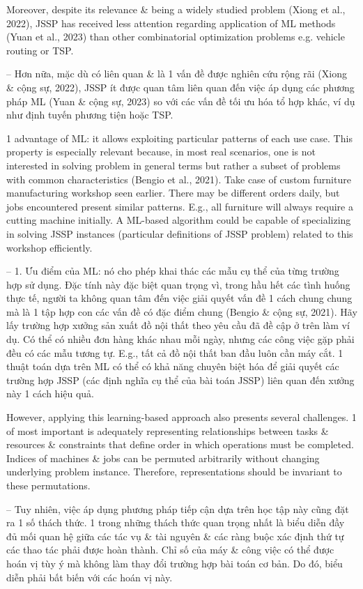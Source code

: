 \documentclass{article}
\begin{document}
\begin{itemize}
    Moreover, despite its relevance \& being a widely studied problem (Xiong et al., 2022), JSSP has received less attention regarding application of ML methods (Yuan et al., 2023) than other combinatorial optimization problems e.g. vehicle routing or TSP.

    -- Hơn nữa, mặc dù có liên quan \& là 1 vấn đề được nghiên cứu rộng rãi (Xiong \& cộng sự, 2022), JSSP ít được quan tâm liên quan đến việc áp dụng các phương pháp ML (Yuan \& cộng sự, 2023) so với các vấn đề tối ưu hóa tổ hợp khác, ví dụ như định tuyến phương tiện hoặc TSP.

    1 advantage of ML: it allows exploiting particular patterns of each use case. This property is especially relevant because, in most real scenarios, one is not interested in solving problem in general terms but rather a subset of problems with common characteristics (Bengio et al., 2021). Take case of custom furniture manufacturing workshop seen earlier. There may be different orders daily, but jobs encountered present similar patterns. E.g., all furniture will always require a cutting machine initially. A ML-based algorithm could be capable of specializing in solving JSSP instances (particular definitions of JSSP problem) related to this workshop efficiently.

    -- 1. Ưu điểm của ML: nó cho phép khai thác các mẫu cụ thể của từng trường hợp sử dụng. Đặc tính này đặc biệt quan trọng vì, trong hầu hết các tình huống thực tế, người ta không quan tâm đến việc giải quyết vấn đề 1 cách chung chung mà là 1 tập hợp con các vấn đề có đặc điểm chung (Bengio \& cộng sự, 2021). Hãy lấy trường hợp xưởng sản xuất đồ nội thất theo yêu cầu đã đề cập ở trên làm ví dụ. Có thể có nhiều đơn hàng khác nhau mỗi ngày, nhưng các công việc gặp phải đều có các mẫu tương tự. E.g., tất cả đồ nội thất ban đầu luôn cần máy cắt. 1 thuật toán dựa trên ML có thể có khả năng chuyên biệt hóa để giải quyết các trường hợp JSSP (các định nghĩa cụ thể của bài toán JSSP) liên quan đến xưởng này 1 cách hiệu quả.

    However, applying this learning-based approach also presents several challenges. 1 of most important is adequately representing relationships between tasks \& resources \& constraints that define order in which operations must be completed. Indices of machines \& jobs can be permuted arbitrarily without changing underlying problem instance. Therefore, representations should be invariant to these permutations.

    -- Tuy nhiên, việc áp dụng phương pháp tiếp cận dựa trên học tập này cũng đặt ra 1 số thách thức. 1 trong những thách thức quan trọng nhất là biểu diễn đầy đủ mối quan hệ giữa các tác vụ \& tài nguyên \& các ràng buộc xác định thứ tự các thao tác phải được hoàn thành. Chỉ số của máy \& công việc có thể được hoán vị tùy ý mà không làm thay đổi trường hợp bài toán cơ bản. Do đó, biểu diễn phải bất biến với các hoán vị này.


\end{itemize}
\end{document}

